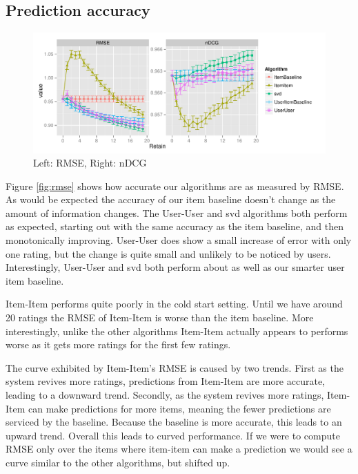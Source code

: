 \documentclass[letterpaper]{sig-alternate}
\begin{document}
\subsection{Prediction accuracy}
\begin{figure}
  \centering

  \includegraphics[width=\linewidth]{../lenskit/output/ekstrandTuned20/accuracy.pdf}
  \caption{Left: RMSE, Right: nDCG}
  \label{fig:rmse}
  \label{fig:ndcg}
\end{figure}
  Figure \ref{fig:rmse} shows how accurate our algorithms are as measured by RMSE.
  As would be expected the accuracy of our item baseline doesn't change as the amount of information changes.
  The User-User and svd algorithms both perform as expected, starting out with the same accuracy as the item baseline, and then monotonically improving.
  User-User does show a small increase of error with only one rating, but the change is quite small and unlikely to be noticed by users.
  Interestingly, User-User and svd both perform about as well as our smarter user item baseline. %

  Item-Item performs quite poorly in the cold start setting.
  Until we have around 20 ratings the RMSE of Item-Item is worse than the item baseline.
  More interestingly, unlike the other algorithms Item-Item actually appears to performs worse as it gets more ratings for the first few ratings.
  
  The curve exhibited by Item-Item's RMSE is caused by two trends.
  First as the system revives more ratings, predictions from Item-Item are more accurate, leading to a downward trend.
  Secondly, as the system revives more ratings, Item-Item can make predictions for more items, meaning the fewer predictions are serviced by the baseline.
  Because the baseline is more accurate, this leads to an upward trend.
  Overall this leads to curved performance.
  If we were to compute RMSE only over the items where item-item can make a prediction we would see a curve similar to the other algorithms, but shifted up.
\end{document}
